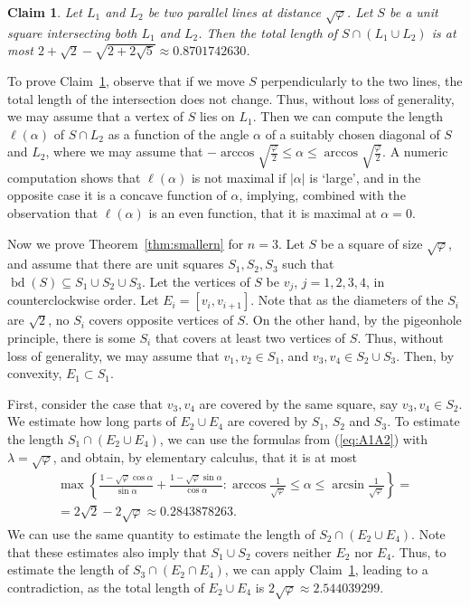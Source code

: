 \documentclass[twoside]{amsart}
\newtheorem{claim}[theorem]{Claim}
\DeclareMathOperator{\bd}{bd}
\begin{document}
\begin{claim}\label{obs2}
Let $L_1$ and $L_2$ be two parallel lines at distance $\sqrt{\varphi}$. Let $S$ be a unit square intersecting both $L_1$ and $L_2$. Then the total length of $S \cap (L_1 \cup L_2)$ is at most $2+\sqrt{2}-\sqrt{2+2\sqrt{5}} \approx 0.8701742630$.
\end{claim}

To prove Claim~\ref{obs2}, observe that if we move $S$ perpendicularly to the two lines, the total length of the intersection does not change. Thus, without loss of generality, we may assume that a vertex of $S$ lies on $L_1$. Then we can compute the length $\ell(\alpha)$ of $S \cap L_2$ as a function of the angle $\alpha$ of a suitably chosen diagonal of $S$ and $L_2$, where we may assume that $- \arccos \sqrt{\frac{\varphi}{2}} \leq \alpha \leq  \arccos \sqrt{\frac{\varphi}{2}}$. A numeric computation shows that $\ell(\alpha)$ is not maximal if $|\alpha|$ is `large', and in the opposite case it is a concave function of $\alpha$, implying, combined with the observation that $\ell(\alpha)$ is an even function, that it is maximal at $\alpha = 0$.

Now we prove Theorem~\ref{thm:smallern} for $n=3$. Let $S$ be a square of size $\sqrt{\varphi}$, and assume that there are unit squares $S_1,S_2,S_3$ such that $\bd(S) \subseteq S_1 \cup S_2 \cup S_3$. 
Let the vertices of $S$ be $v_j$, $j=1,2,3,4$, in counterclockwise order. Let $E_i = [v_i,v_{i+1}]$. 
Note that as the diameters of the $S_i$ are $\sqrt{2}$, no $S_i$ covers opposite vertices of $S$. On the other hand, by the pigeonhole principle, there is some $S_i$ that covers at least two vertices of $S$. Thus, without loss of generality, we may assume that $v_1, v_2 \in S_1$, and $v_3, v_4 \in S_2 \cup S_3$.
Then, by convexity, $E_1 \subset S_1$.

First, consider the case that $v_3, v_4$ are covered by the same square, say $v_3, v_4 \in S_2$. We estimate how long parts of $E_2 \cup E_4$ are covered by $S_1$, $S_2$ and $S_3$. To estimate the length $S_1 \cap (E_2 \cup E_4)$, we can use the formulas from (\ref{eq:A1A2}) with $\lambda = \sqrt{\varphi}$, and obtain, by elementary calculus, that it is at most
\begin{multline*}
\max \left\{ \frac{1-\sqrt{\varphi} \cos \alpha}{\sin \alpha} + \frac{1-\sqrt{\varphi} \sin \alpha}{\cos \alpha} : \arccos \frac{1}{\sqrt{\varphi}} \leq \alpha \leq \arcsin \frac{1}{\sqrt{\varphi}} \right\} = \\ = 2\sqrt{2}-2\sqrt{\varphi} \approx 0.2843878263.
\end{multline*}
We can use the same quantity to estimate the length of $S_2 \cap (E_2 \cup E_4)$. Note that these estimates also imply that $S_1 \cup S_2$ covers neither $E_2$ nor $E_4$. Thus, to estimate the length of $S_3 \cap (E_2 \cap E_4)$, we can apply Claim~\ref{obs2}, leading to a contradiction, as the total length of $E_2 \cup E_4$ is $2\sqrt{\varphi} \approx 2.544039299$.
\end{document}
